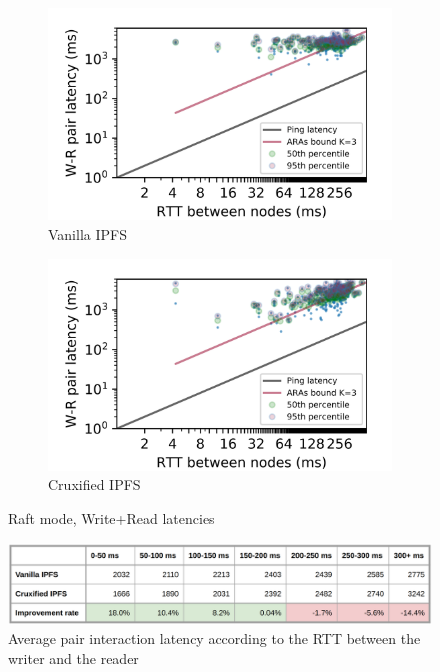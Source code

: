 \documentclass[a4paper,11pt,oneside]{report}
\begin{document}
\begin{figure}[h!]
\centering
\begin{subfigure}{.5\textwidth}
  \centering
  \includegraphics[width=1\linewidth]{graphs/plot_log_vanilla_crdt.png}
  \caption{Vanilla IPFS}
  \label{fig:log1}
\end{subfigure}%
\begin{subfigure}{.5\textwidth}
  \centering
  \includegraphics[width=1\linewidth]{graphs/plot_log_cruxified_crdt.png}
  \caption{Cruxified IPFS}
  \label{fig:log2}
\end{subfigure}
\caption{Raft mode, Write+Read latencies}
\label{fig:log}
\end{figure}


\begin{figure}[h!]
  \centering
  \includegraphics[width=1\linewidth]{tables/writeread.png}
  \caption{Average pair interaction latency according to the RTT between the writer and the reader}
  \label{tab:wr}
\end{figure}
\end{document}
